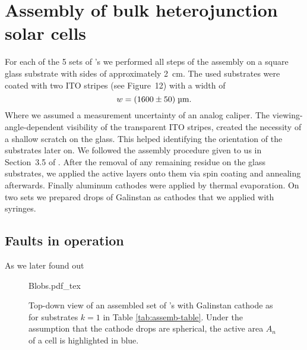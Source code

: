 \documentclass[a4paper,10pt,twocolumn]{article}
\begin{document}
\begin{extract*}
\begin{table}[h]
\begin{tabular}{@{}ccccccc@{}}
	\end{tabular}
\end{table}

\section{Assembly of bulk heterojunction solar cells}\label{sec:assembly}
For each of the 5 sets of \BHSC's we performed all steps of the assembly on a square glass substrate with sides of approximately 2~cm. The used substrates were coated with two ITO stripes (see \cite{labdesc} Figure~12) with a width of
\begin{equation*}
w = (1600\pm50)\;\text{\textmu m}.
\end{equation*}
Where we assumed a measurement uncertainty of an analog caliper. The viewing-angle-dependent visibility of the transparent ITO stripes, created the necessity of a shallow scratch on the glass. This helped identifying the orientation of the substrates later on.\mypar
We followed the assembly procedure given to us in Section~3.5 of \cite{labdesc}. After the removal of any remaining residue on the glass substrates, we applied the active layers onto them via spin coating and annealing afterwards. Finally aluminum cathodes were applied by thermal evaporation. On two sets we prepared drops of Galinstan as cathodes that we applied with syringes. 

\subsection{Faults in operation}
As we later found out 

\begin{figure}[h]\centering
	{Blobs.pdf_tex}
	\caption{Top-down view of an assembled set of \BHSC's with Galinstan cathode as for substrates $k=1$ in Table \ref{tab:assemb-table}. Under the assumption that the cathode drops are spherical, the active area $A_n$ of a cell is highlighted in blue.}
	\label{fig:blobs}
\end{figure}


\end{extract*}
\end{document}
